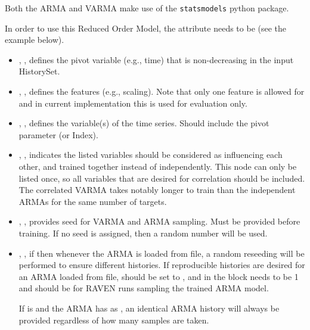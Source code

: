 Both the ARMA and VARMA make use of the \texttt{statsmodels} python package.

%
In order to use this Reduced Order Model, the  attribute
 needs to be  (see the example
below).
%
\subnodeIntro

\begin{itemize}
  \item {}, , defines the pivot variable (e.g., time) that is non-decreasing in
  the input HistorySet.
  \item {}, , defines the features (e.g., scaling). Note that only
  one feature is allowed for  and in current implementation this is used for evaluation only.
  \item {}, , defines the variable(s) of the
    time series.  Should include the pivot parameter (or Index).
  \item {}, , indicates the listed variables
    should be considered as influencing each other, and trained together instead of independently.  This node
    can only be listed once, so all variables that are desired for correlation should be included.  \nb The
    correlated VARMA takes notably longer to train than the independent ARMAs for the same number of targets.
  \item {}, , provides seed for VARMA and ARMA sampling.
   Must be provided before training. If no seed is assigned,
   then a random number will be used.

   \item {}, , if  then whenever the ARMA is loaded from file, a
    random reseeding will be performed to ensure different histories. \nb If reproducible histories are desired for an ARMA loaded from file,
     should be set to , and in the  block  needs to be 1
    and  should be
      for RAVEN runs sampling the trained ARMA model.

If  is  and the ARMA has  as , an identical ARMA history will always be provided regardless of how many samples are taken.


\end{itemize}
